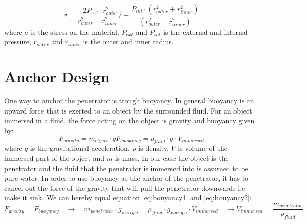 \begin{equation}\label{eq:pressure}
\sigma = \frac{-2 P_{ext}\cdot r_{outer}^2}{r_{outer}^2-r_{inner}^2}/ + \frac{P_{int}\cdot (r_{outer}^2+r_{inner}^2)}{(r_{outer}^2-r_{inner}^2)}
\end{equation}
where $\sigma$ is the stress on the material, $P_{ext}$ and $P_{int}$ is the external and internal pressure, $r_{outer}$ and $r_{inner}$ is the outer and inner radius. 


\section{Anchor Design}
One way to anchor the penetrator is trough buoyancy. In general buoyancy is an upward force that is exerted to an object by the surrounded fluid. For an object immersed in a fluid, the force acting on the object is gravity and buoyancy given by:
\begin{subequations}
\begin{equation}\label{eq:bouyancy1}
F_{gravity} = m_{object} \cdot g
\end{equation}
\begin{equation} \label{eq:bouyancy2}
F_{buoyancy} = \rho_{fluid}\cdot g \cdot V_{immersed} 
\end{equation}
\end{subequations}
where $g$ is the gravitational acceleration, $\rho$ is density, $V$ is volume of the immersed part of the object and $m$ is mass.  In our case the object is the penetrator and the fluid that the penetrator is immersed into is assumed to be pure water. In order to use buoyancy as the anchor of the penetrator, it has to cancel out the force of the gravity that will pull the penetrator downwards i.e make it sink. We can hereby equal equation \ref{eq:bouyancy1} and \ref{eq:bouyancy2}:
\begin{subequations}
\begin{equation*}\label{eq:bou1}
F_{gravity} = F_{buoyancy} \quad \rightarrow \quad m_{penetrator}\cdot g_{Europa} = \rho_{fluid}\cdot g_{Europa} \cdot V_{immersed}   \quad \rightarrow 
\end{equation*}
\begin{equation} \label{eq:bou2}
V_{immersed} = \frac{m_{penetrator}}{\rho_{fluid}}
\end{equation}
\end{subequations}
